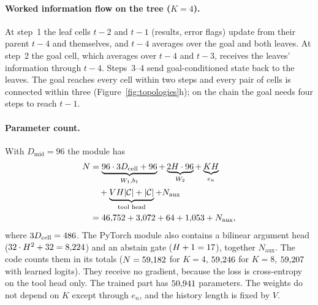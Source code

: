 \documentclass[10pt]{article}
\begin{document}
\paragraph{Worked information flow on the tree ($K{=}4$).} At step~1 the leaf cells $t{-}2$ and $t{-}1$ (results, error flags) update from their parent $t{-}4$ and themselves, and $t{-}4$ averages over the goal and both leaves. At step~2 the goal cell, which averages over $t{-}4$ and $t{-}3$, receives the leaves' information through $t{-}4$. Steps~3--4 send goal-conditioned state back to the leaves. The goal reaches every cell within two steps and every pair of cells is connected within three (Figure~\ref{fig:topologies}h); on the chain the goal needs four steps to reach $t{-}1$.

\paragraph{Parameter count.} With $D_{\text{mid}}{=}96$ the module has
\begin{equation}\label{eq:params}
\begin{aligned}
N &= \underbrace{96\cdot 3D_{\text{cell}} + 96}_{W_1,b_1} + \underbrace{2H\cdot 96}_{W_2} + \underbrace{KH}_{e_n} \\ &\quad + \underbrace{VH|\mathcal{C}| + |\mathcal{C}|}_{\text{tool head}} + N_{\text{aux}} \\
&= 46{,}752 + 3{,}072 + 64 + 1{,}053 + N_{\text{aux}} ,
\end{aligned}
\end{equation}
where $3D_{\text{cell}} = 486$. The PyTorch module also contains a bilinear argument head ($32\cdot H^2 + 32 = 8{,}224$) and an abstain gate ($H+1 = 17$), together $N_{\text{aux}}$. The code counts them in its totals ($N = 59{,}182$ for $K{=}4$, $59{,}246$ for $K{=}8$, $59{,}207$ with learned logits). They receive no gradient, because the loss is cross-entropy on the tool head only. The trained part has $50{,}941$ parameters. The weights do not depend on $K$ except through $e_n$, and the history length is fixed by $V$.
\end{document}
